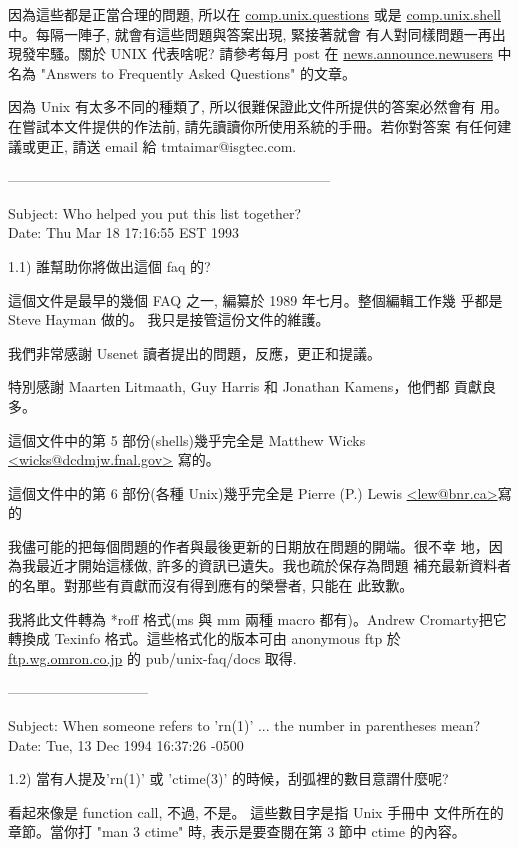 \documentclass{letter}
\begin{document}
\begin{CJK}{Bg5}{ming}
因為這些都是正當合理的問題, 所以在 \url{comp.unix.questions} 或是 
\url{comp.unix.shell} 中。每隔一陣子, 就會有這些問題與答案出現, 緊接著就會
有人對同樣問題一再出現發牢騷。關於 UNIX 代表啥呢? 請參考每月 post 在 
\url{news.announce.newusers} 中名為 "Answers to Frequently Asked Questions" 
的文章。

因為 Unix 有太多不同的種類了, 所以很難保證此文件所提供的答案必然會有
用。在嘗試本文件提供的作法前, 請先讀讀你所使用系統的手冊。若你對答案
有任何建議或更正, 請送 email 給 tmtaimar@isgtec.com.

---------------------------------------------------------------------

Subject: Who helped you put this list together? \\
Date: Thu Mar 18 17:16:55 EST 1993

1.1)  誰幫助你將做出這個 faq 的?

	這個文件是最早的幾個 FAQ 之一, 編纂於 1989 年七月。整個編輯工作幾
	乎都是 Steve Hayman 做的。 我只是接管這份文件的維護。

	我們非常感謝 Usenet 讀者提出的問題，反應，更正和提議。

	特別感謝 Maarten Litmaath, Guy Harris 和 Jonathan  Kamens，他們都
	貢獻良多。

	這個文件中的第 5 部份(shells)幾乎完全是 Matthew Wicks 
	\url{<wicks@dcdmjw.fnal.gov>} 寫的。

	這個文件中的第 6 部份(各種 Unix)幾乎完全是 Pierre (P.) Lewis 
	\url{<lew@bnr.ca>}寫的

	我儘可能的把每個問題的作者與最後更新的日期放在問題的開端。很不幸
	地，因為我最近才開始這樣做, 許多的資訊已遺失。我也疏於保存為問題
	補充最新資料者的名單。對那些有貢獻而沒有得到應有的榮譽者, 只能在
        此致歉。

	我將此文件轉為 *roff 格式(ms 與 mm 兩種 macro 都有)。Andrew 
	Cromarty把它轉換成 Texinfo 格式。這些格式化的版本可由 anonymous 
	ftp 於 \url{ftp.wg.omron.co.jp} 的 pub/unix-faq/docs 取得.

------------------------------

Subject: When someone refers to 'rn(1)' ... the number in parentheses mean?\\
Date: Tue, 13 Dec 1994 16:37:26 -0500

1.2)  當有人提及'rn(1)' 或 'ctime(3)' 的時候，刮弧裡的數目意謂什麼呢?

	看起來像是 function call, 不過, 不是。 這些數目字是指 Unix 手冊中
	文件所在的章節。當你打 "man 3 ctime" 時, 表示是要查閱在第 3 節中 
	ctime 的內容。


\end{CJK}
\end{document}
